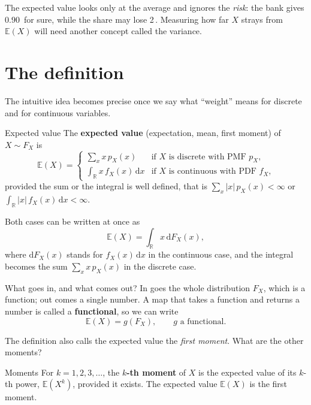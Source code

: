 \documentclass[a4paper,12pt,oneside]{report}
\begin{document}
The expected value looks only at the average and ignores the \emph{risk}:
the bank gives $0.90$\,\texteuro{} for sure, while the share may lose
2\,\texteuro. Measuring how far $X$ strays from $\mathbb{E}(X)$ will need another
concept called the variance.

\section{The definition}

The intuitive idea becomes precise once we say what ``weight'' means for
discrete and for continuous variables.

\begin{frameddefn}{Expected value}\label{def:expected-value}
The \textbf{expected value} (expectation, mean, first moment) of
$X\sim F_X$ is
\[
\mathbb{E}(X)=
\begin{cases}
\displaystyle\sum_x x\,p_X(x) & \text{if $X$ is discrete with PMF $p_X$,}\\[2ex]
\displaystyle\int_{\mathbb{R}} x\,f_X(x)\,\mathrm{d}x & \text{if $X$ is continuous with PDF $f_X$,}
\end{cases}
\]
provided the sum or the integral is well defined, that is
$\sum_x|x|\,p_X(x)<\infty$ or $\int_{\mathbb{R}}|x|\,f_X(x)\,\mathrm{d}x<\infty$.
\par\medskip\noindent Both cases can be written at once as
\[
\mathbb{E}(X)=\int_{\mathbb{R}}x\,\mathrm{d}F_X(x),
\]
where $\mathrm{d}F_X(x)$ stands for $f_X(x)\,\mathrm{d}x$ in the continuous
case, and the integral becomes the sum $\sum_x x\,p_X(x)$ in the discrete
case.
\end{frameddefn}

What goes in, and what comes out? In goes the whole distribution $F_X$,
which is a function; out comes a single number. A map that takes a function
and returns a number is called a \label{functional}\textbf{functional}, so we
can write
\[
\mathbb{E}(X)=g(F_X),\qquad g\text{ a functional.}
\]

The definition also calls the expected value the \emph{first moment}.
What are the other moments?

\begin{frameddefn}{Moments}\label{def:moments}
For $k=1,2,3,\ldots$, the \textbf{$k$-th moment} of $X$ is the expected
value of its $k$-th power, $\mathbb{E}(X^k)$, provided it exists. The
expected value $\mathbb{E}(X)$ is the first moment.
\end{frameddefn}
\end{document}
